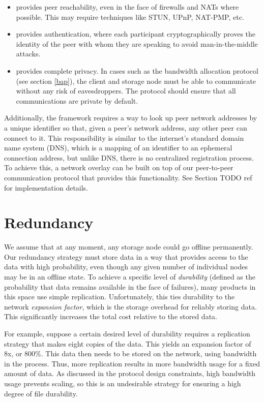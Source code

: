 \documentclass[11pt,fleqn,openany]{book}
\newcommand{\todo}[1]{{\color{red} TODO #1 }}
\begin{document}
\begin{itemize}
\item provides peer reachability, even in the face of firewalls
and NATs where possible.
This may require techniques like STUN, UPnP, NAT-PMP, etc.
\item provides authentication, where each participant cryptographically
proves the identity of the peer with whom they are speaking to avoid
man-in-the-middle attacks.
\item provides complete privacy. In cases such as the bandwidth allocation
protocol (see section \ref{bap}), the client and storage node must be able
to communicate without any risk of eavesdroppers. The protocol should
ensure that all communications are private by default.
\end{itemize}

Additionally, the framework requires a way to look up peer network addresses
by a unique identifier so that, given a peer's network address, any other
peer can connect to it. This responsibility is similar to the internet's
standard domain name system (DNS), which is a mapping of an identifier to an
ephemeral connection address, but unlike DNS, there is no centralized
registration process.
To achieve this, a network overlay can be
built on top of our peer-to-peer communication protocol that provides this
functionality. See Section \todo{ref} for implementation details.

\section{Redundancy}

We assume that at any moment, any storage node could go offline permanently.
Our redundancy
strategy must store data in a way that provides access to the data with high
probability, even though any given number of individual nodes may be in
an offline state. To
achieve a specific level of {\em durability} (defined as the probability that
data remains available in the face of failures), many products in this space use
simple replication. Unfortunately, this ties durability to the network {\em
expansion factor}, which is the storage overhead for reliably storing data. This
significantly increases the total cost relative to the stored data.

For example, suppose a certain desired level of durability requires a
replication strategy that makes eight copies of the data. This yields an
expansion factor of 8x, or 800\%. This data then needs to be stored on the
network, using bandwidth in the process. Thus, more replication results in more
bandwidth usage for a fixed amount of data. As discussed in the protocol design
constraints, high bandwidth usage prevents scaling, so this is an undesirable
strategy for ensuring a high degree of file durability.
\end{document}
